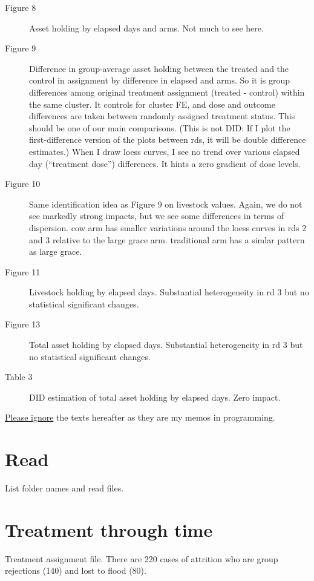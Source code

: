 \begin{description}
\item[Figure 8]	Asset holding by \textsf{elapsed} days and \textsf{arms}. Not much to see here.
\item[Figure 9]	Difference in group-average asset holding between the treated and the control in \textsf{assignment} by difference in \textsf{elapsed} and \textsf{arms}. So it is group differences among original treatment assignment (treated - control) within the same cluster. It controls for cluster FE, and dose and outcome differences are taken between randomly assigned treatment status. This should be one of our main comparisons. (This is not DID: If I plot the first-difference version of the plots between rds, it will be double difference estimates.) When I draw loess curves, I see no trend over various elapsed day (``treatment dose'') differences. It hints a zero gradient of dose levels.
\item[Figure 10]	Same identification idea as Figure 9 on livestock values. Again, we do not see markedly strong impacts, but we see some differences in terms of dispersion. \textsf{cow} arm has smaller variations around the loess curves in rds 2 and 3 relative to the \textsf{large grace} arm. \textsf{traditional} arm has a simlar pattern as \textsf{large grace}.
\item[Figure 11]	Livestock holding by \textsf{elapsed} days. Substantial heterogeneity in rd 3 but no statistical significant changes.
\item[Figure 13]	Total asset holding by \textsf{elapsed} days. Substantial heterogeneity in rd 3 but no statistical significant changes.
\item[Table 3]	DID estimation of total asset holding by \textsf{elapsed} days. Zero impact.
\end{description}

\underline{Please ignore} the texts hereafter as they are my memos in programming.


\section{Read}

List folder names and read files.


\section{Treatment through time}


Treatment assignment file. There are 220 cases of attrition who are group rejections (140) and lost to flood (80). 


